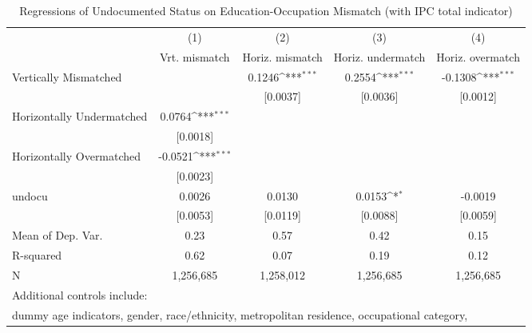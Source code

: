 \begin{table}[htbp]\centering
\def\sym#1{\ifmmode^{#1}\else\(^{#1}\)\fi}
\caption{Regressions of Undocumented Status on Education-Occupation Mismatch (with IPC total indicator)}
\begin{tabular}{l*{4}{c}}
\toprule
                    &\multicolumn{1}{c}{(1)}         &\multicolumn{1}{c}{(2)}         &\multicolumn{1}{c}{(3)}         &\multicolumn{1}{c}{(4)}         \\
                    &Vrt. mismatch         &Horiz. mismatch         &Horiz. undermatch         &Horiz. overmatch         \\
\midrule
Vertically Mismatched&                     &      0.1246\sym{***}&      0.2554\sym{***}&     -0.1308\sym{***}\\
                    &                     &    [0.0037]         &    [0.0036]         &    [0.0012]         \\
\addlinespace
Horizontally Undermatched&      0.0764\sym{***}&                     &                     &                     \\
                    &    [0.0018]         &                     &                     &                     \\
\addlinespace
Horizontally Overmatched&     -0.0521\sym{***}&                     &                     &                     \\
                    &    [0.0023]         &                     &                     &                     \\
\addlinespace
undocu              &      0.0026         &      0.0130         &      0.0153\sym{*}  &     -0.0019         \\
                    &    [0.0053]         &    [0.0119]         &    [0.0088]         &    [0.0059]         \\
\midrule
Mean of Dep. Var.   &        0.23         &        0.57         &        0.42         &        0.15         \\
R-squared           &        0.62         &        0.07         &        0.19         &        0.12         \\
N                   &   1,256,685         &   1,258,012         &   1,256,685         &   1,256,685         \\
\bottomrule
\multicolumn{5}{l}{\footnotesize Additional controls include:}\\
\multicolumn{5}{l}{\footnotesize dummy age indicators, gender, race/ethnicity, metropolitan residence, occupational category,}\\

\end{tabular}
\end{table}
